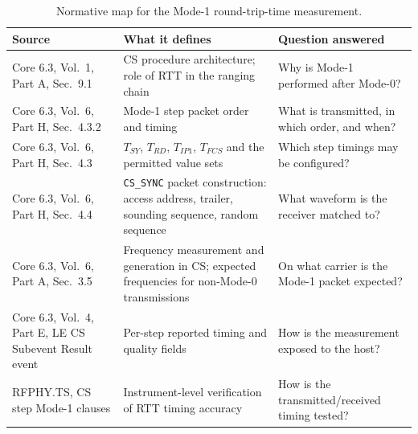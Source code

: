 \documentclass[11pt,a4paper]{article}
\newcommand{\Tsy}{T_{SY}}
\newcommand{\Trd}{T_{RD}}
\newcommand{\Tip}{T_{IP1}}
\newcommand{\code}[1]{\texttt{\small #1}}
\begin{document}
\begin{table}[h]
\caption{Normative map for the Mode-1 round-trip-time measurement.}
\label{tab:normmap}
\centering\small
\begin{tabular}{@{}L{40mm}L{52mm}L{52mm}@{}}
\toprule
Source & What it defines & Question answered \\
\midrule
Core 6.3, Vol.\ 1, Part A, Sec.\ 9.1 & CS procedure architecture; role of RTT in the ranging chain & Why is Mode-1 performed after Mode-0? \\
Core 6.3, Vol.\ 6, Part H, Sec.\ 4.3.2 & Mode-1 step packet order and timing & What is transmitted, in which order, and when? \\
Core 6.3, Vol.\ 6, Part H, Sec.\ 4.3 & $\Tsy$, $\Trd$, $\Tip$, $T_{FCS}$ and the permitted value sets & Which step timings may be configured? \\
Core 6.3, Vol.\ 6, Part H, Sec.\ 4.4 & \code{CS\_SYNC} packet construction: access address, trailer, sounding sequence, random sequence & What waveform is the receiver matched to? \\
Core 6.3, Vol.\ 6, Part A, Sec.\ 3.5 & Frequency measurement and generation in CS; expected frequencies for non-Mode-0 transmissions & On what carrier is the Mode-1 packet expected? \\
Core 6.3, Vol.\ 4, Part E, LE CS Subevent Result event & Per-step reported timing and quality fields & How is the measurement exposed to the host? \\
RFPHY.TS, CS step Mode-1 clauses & Instrument-level verification of RTT timing accuracy & How is the transmitted/received timing tested? \\
\bottomrule
\end{tabular}
\end{table}
\end{document}
